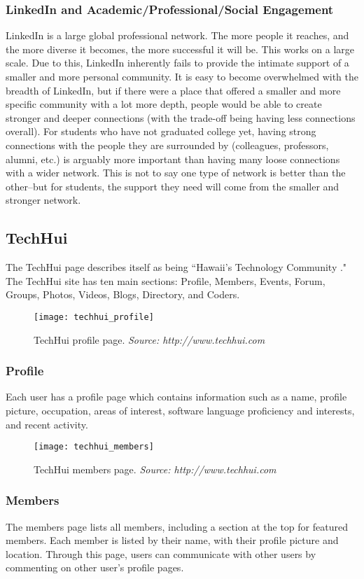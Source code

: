 \subsubsection{LinkedIn and Academic/Professional/Social Engagement}
LinkedIn is a large global professional network. The more people it reaches, and the more diverse it becomes, the more successful it will be. This works on a large scale. Due to this, LinkedIn inherently fails to provide the intimate support of a smaller and more personal community. It is easy to become overwhelmed with the breadth of LinkedIn, but if there were a place that offered a smaller and more specific community with a lot more depth, people would be able to create stronger and deeper connections (with the trade-off being having less connections overall). For students who have not graduated college yet, having strong connections with the people they are surrounded by (colleagues, professors, alumni, etc.) is arguably more important than having many loose connections with a wider network. This is not to say one type of network is better than the other--but for students, the support they need will come from the smaller and stronger network. 

\subsection{TechHui}
The TechHui page describes itself as being ``Hawaii's Technology Community  \cite{TechHui}." The TechHui site has ten main sections: Profile, Members, Events, Forum, Groups, Photos, Videos, Blogs, Directory, and Coders.

\begin{figure}[h]
\centering
\texttt{[image: techhui\_profile]}
\caption{TechHui profile page. \textit{Source: http://www.techhui.com}}
\end{figure}
\subsubsection{Profile}
Each user has a profile page which contains information such as a name, profile picture, occupation, areas of interest, software language proficiency and interests, and recent activity.

\begin{figure}[h]
\centering
\texttt{[image: techhui\_members]}
\caption{TechHui members page. \textit{Source: http://www.techhui.com}}
\end{figure}
\subsubsection{Members}
The members page lists all members, including a section at the top for featured members. Each member is listed by their name, with their profile picture and location. Through this page, users can communicate with other users by commenting on other user's profile pages.

